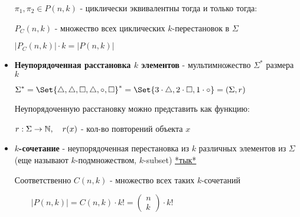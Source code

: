 \documentclass[12pt]{article}
\begin{document}
\begin{itemize}
\begin{minipage}{\linewidth}
\begin{wrapfigure}{r}{0pt}
            \end{wrapfigure}


            $\displaystyle \pi_1, \pi_2 \in P(n, k)$ - циклически эквивалентны тогда и только тогда:


            $\displaystyle P_C(n, k)$ - множество всех циклических $k$-перестановок в $\Sigma$

            $\displaystyle |P_C(n, k)| \cdot k = |P(n, k)|$


        \end{minipage}


        \item \textbf{Неупорядоченная расстановка $k$ элементов} - мультимножество $\displaystyle \Sigma^*$ размера $k$

        \Exs $\displaystyle \Sigma^* = \Set{\triangle, \triangle, \Box, \triangle, \circ, \Box}^* = \Set{3 \cdot \triangle, 2 \cdot \Box, 1 \cdot \circ} = (\Sigma, r)$

        Неупорядоченную расстановку можно представить как функцию:

        $r : \Sigma \to \mathbb{N}, \quad r(x)$ - кол-во повторений объекта $x$


        \item \textbf{$k$-сочетание} - неупорядоченная перестановка из $k$ различных элементов из $\Sigma$ (еще называют $k$-подмножеством, $k$-subset)
        \hfill\href{https://ru.wikipedia.org/wiki/%D0%A1%D0%BE%D1%87%D0%B5%D1%82%D0%B0%D0%BD%D0%B8%D0%B5}{*тык*}

        Соответственно $C(n, k)$ - множество всех таких $k$-сочетаний

        $\quad\quad |P(n, k)| = C(n, k) \cdot k! = \begin{pmatrix}n \\ k\end{pmatrix} \cdot k!$


\end{itemize}
\end{document}
